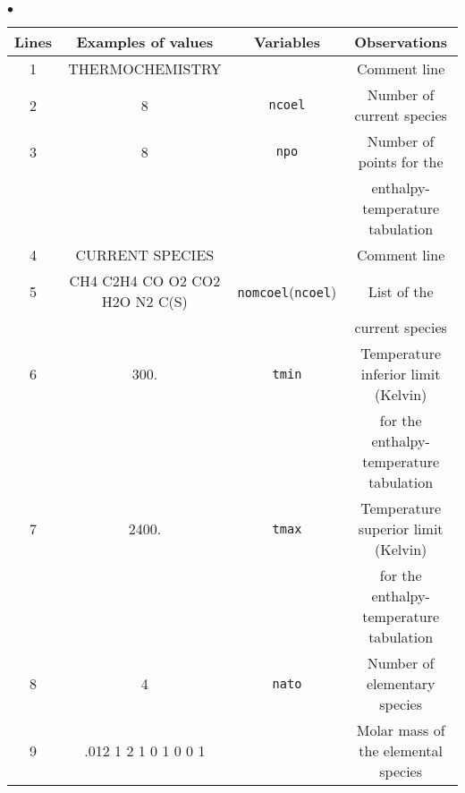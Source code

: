 {{{\begin{list}{$\bullet$}{}
\begin{table}[htbp]
\begin{center}
\tiny{
\begin{tabular}{|c|c|c|c|} \hline
 Lines  &      Examples of values        &        Variables              & Observations                                         \\ \hline
   1    &          THERMOCHEMISTRY       &                               & Comment line                                         \\ \hline
   2    &               8                & \texttt{ncoel\index{ncoel}}   & Number of current species                            \\ \hline
   3    &               8                &  \texttt{npo\index{npo}}      & Number of points for the                             \\
        &                                &                               & enthalpy-temperature tabulation                      \\ \hline
   4    &        CURRENT SPECIES         &                               & Comment line                                         \\ \hline
   5    & CH4 C2H4 CO O2 CO2 H2O N2 C(S) & \texttt{nomcoel\index{nomcoel}}(\texttt{ncoel}) & List of the                                          \\
        &                                &                               & current species                                      \\ \hline
   6    &               300.             &  \texttt{tmin\index{tmin}}    & Temperature inferior limit (Kelvin)                  \\
        &                                &                               & for the enthalpy-temperature tabulation              \\ \hline
   7    &              2400.             &  \texttt{tmax\index{tmax}}    & Temperature superior limit (Kelvin)                  \\
        &                                &                               & for the enthalpy-temperature tabulation              \\ \hline
   8    &               4                &  \texttt{nato\index{nato}}    & Number of elementary species                          \\ \hline
   9    &  .012  1  2  1  0  1  0  0  1  &                               & Molar mass of the elemental species                  \\

\end{tabular}}
\end{center}
\end{table}
\end{list}}}}
